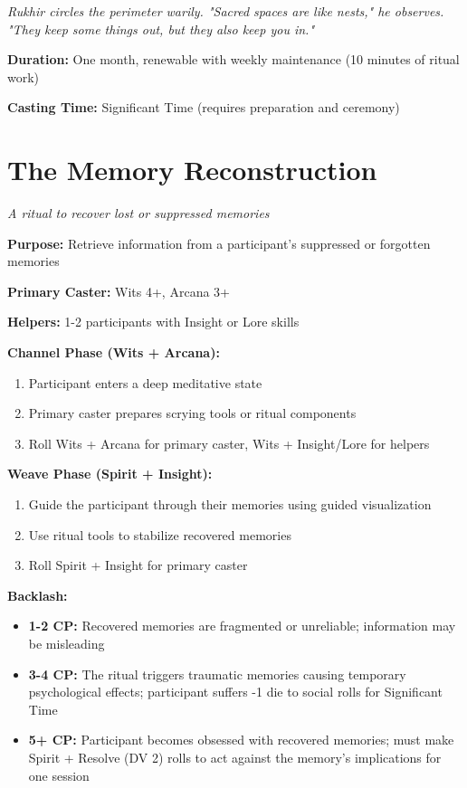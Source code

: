 \documentclass[12pt,twoside]{book}
\newcommand{\shadow}[1]{\textit{#1}}
\begin{document}
\shadow{Rukhir circles the perimeter warily. "Sacred spaces are like nests," he observes. "They keep some things out, but they also keep you in."}

\textbf{Duration:} One month, renewable with weekly maintenance (10 minutes of ritual work)

\textbf{Casting Time:} Significant Time (requires preparation and ceremony)

\section*{The Memory Reconstruction}
\textit{A ritual to recover lost or suppressed memories}

\textbf{Purpose:} Retrieve information from a participant's suppressed or forgotten memories

\textbf{Primary Caster:} Wits 4+, Arcana 3+

\textbf{Helpers:} 1-2 participants with Insight or Lore skills

\textbf{Channel Phase (Wits + Arcana):}
\begin{enumerate}
\item Participant enters a deep meditative state
\item Primary caster prepares scrying tools or ritual components
\item Roll Wits + Arcana for primary caster, Wits + Insight/Lore for helpers
\end{enumerate}

\textbf{Weave Phase (Spirit + Insight):}
\begin{enumerate}
\item Guide the participant through their memories using guided visualization
\item Use ritual tools to stabilize recovered memories
\item Roll Spirit + Insight for primary caster
\end{enumerate}

\textbf{Backlash:}
\begin{itemize}
\item \textbf{1-2 CP:} Recovered memories are fragmented or unreliable; information may be misleading
\item \textbf{3-4 CP:} The ritual triggers traumatic memories causing temporary psychological effects; participant suffers -1 die to social rolls for Significant Time
\item \textbf{5+ CP:} Participant becomes obsessed with recovered memories; must make Spirit + Resolve (DV 2) rolls to act against the memory's implications for one session
\end{itemize}
\end{document}
